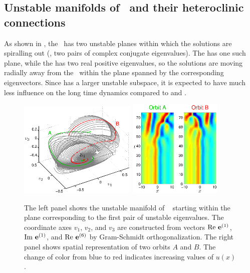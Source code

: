 \subsection{Unstable manifolds of \eqva\ and their heteroclinic
            connections}
\label{sec:unstMnflds}

As shown in ,
the  \eqv\ has two unstable
planes within which the solutions are spiralling out (\ie, two
pairs of complex conjugate eigenvalues).  The  has one such plane,
while the  has two real positive eigenvalues, so the solutions are
moving radially away from the \eqv\ within the plane spanned
by the corresponding eigenvectors.  Since  has
a larger unstable subspace, it is expected to have much less influence on the
long time dynamics compared to  and .

\begin{figure}[t]
\begin{center}
\includegraphics[width=0.5\textwidth, clip=true]{figs/ks22_E1_plane1_manifold_c.eps}
\includegraphics[width=0.4\textwidth, clip=true]{figs/ks22_E1_plane1_orbits_c.eps}
\end{center}
\caption{
The left panel shows the unstable
manifold of \eqv\  starting within the plane
corresponding to the first pair of unstable eigenvalues. The
coordinate axes $v_1$, $v_2$, and $v_3$ are constructed from vectors
${\rm Re\,} \,{\mathbf e}^{(1)}$, ${\rm Im\,} \,{\mathbf e}^{(1)}$,
and ${\rm Re\,} \,{\mathbf e}^{(6)}$
by Gram-Schmidt orthogonalization.
The right panel shows spatial representation of two orbits $A$ and $B$.
The change of color from blue to red indicates increasing values of
$u(x)$.
}
\label{f:KS22E1man1}
\end{figure}

